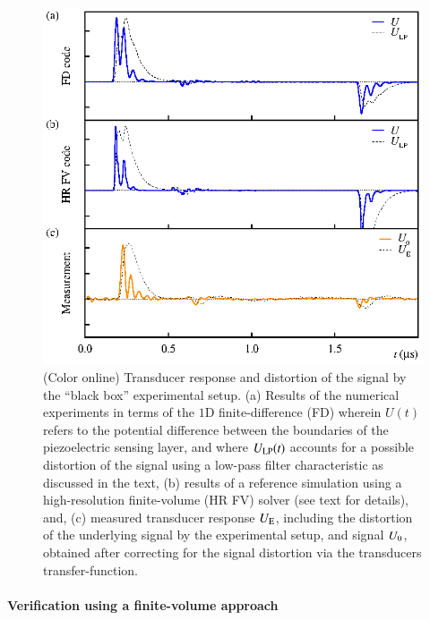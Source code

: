 \documentclass[5p,times,twocolumn]{elsarticle}
\begin{document}
\begin{figure}[t!]
\begin{center}
\includegraphics[width=1.0\linewidth]{./FIGS/cmp_FD_FV_EXP.eps}
\end{center}
\caption{
(Color online) Transducer response and distortion of the signal by the ``black
box'' experimental setup.  (a) Results of the numerical experiments in terms
of the $1$D finite-difference (FD) wherein
$U(t)$ refers to the potential difference between the boundaries of the
piezoelectric sensing layer, and where $U_{\rm{LP}}(t)$ accounts for a possible
distortion of the signal using a low-pass filter characteristic as discussed in
the text,
(b) results of a reference simulation using a high-resolution finite-volume (HR FV)
solver (see text for details), and,
(c) measured transducer response $U_{\rm{E}}$, including the
distortion of the underlying signal by the experimental setup, and signal
$U_{\rm{0}}$, obtained after correcting for the signal distortion via the
transducers transfer-function.
\label{fig:TvsE}}
\end{figure}  


\paragraph{Verification using a finite-volume approach}
\end{document}
